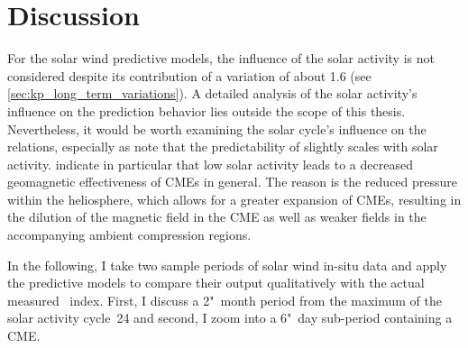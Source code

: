 \section{Discussion}
\label{sec:discussion_ch2}
For the solar wind predictive \Kp{} models, the influence of the solar activity is not considered despite its contribution of a \Kp{} variation of about 1.6 (see \autoref{sec:kp_long_term_variations}). A detailed analysis of the solar activity's influence on the \Kp{} prediction behavior lies outside the scope of this thesis. Nevertheless, it would be worth examining the solar cycle's influence on the relations, especially as \citet{Wing2005} note that the predictability of \Kp{} slightly scales with solar activity.
\citet{Gopalswamy2014} indicate in particular that low solar activity leads to a decreased geomagnetic effectiveness of CMEs in general. The reason is the reduced pressure within the heliosphere, which allows for a greater expansion of CMEs, resulting in the dilution of the magnetic field in the CME as well as weaker fields in the accompanying ambient compression regions.

In the following, I take two sample periods of solar wind in-situ data and apply the predictive \Kp{} models to compare their output qualitatively with the actual measured \Kp~index. First, I discuss a 2"~month period from the maximum of the solar activity cycle~24 and second, I zoom into a 6"~day sub-period containing a CME.

